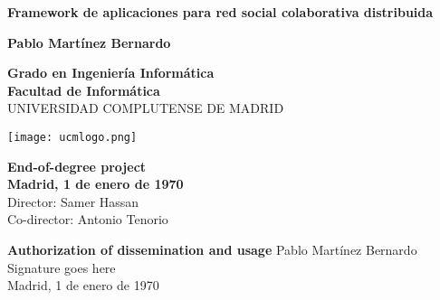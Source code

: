 \setcounter{page}{1}

\newpage
\thispagestyle{cover}
\begin{center}
  {\Huge \bf Framework de aplicaciones para red social colaborativa distribuida}

  \vfill
  {\LARGE\bf Pablo Martínez Bernardo}

  \vfill

  {\Large\bf Grado en Ingeniería Informática\\}
  {\Large\bf Facultad de Informática\\}
  \vspace*{0.2cm}
  {UNIVERSIDAD COMPLUTENSE DE MADRID}
  \vspace*{0.9cm}
  
   \begin{center}
   \texttt{[image: ucmlogo.png]}
   \end{center}
  
  \vspace*{0.5cm}

  {\large\bf End-of-degree project\\
             Madrid, 1 de enero de 1970\\}
  \vspace*{0.7cm}
  {\large Director: Samer Hassan\\
          Co-director: Antonio Tenorio}
  \rhead{}
  \rfoot{}
  \fancyhf{}

\end{center}



\newpage
\thispagestyle{empty}
\begin{center}
  \textbf{\Huge Authorization of dissemination and usage}
  \vfill
  {\Large Pablo Martínez Bernardo\\}
  \vspace*{1cm}
  {\Huge Signature goes here\\}
  \vspace*{1cm}
  {\Large Madrid, 1 de enero de 1970}
  \vfill
\end{center}

